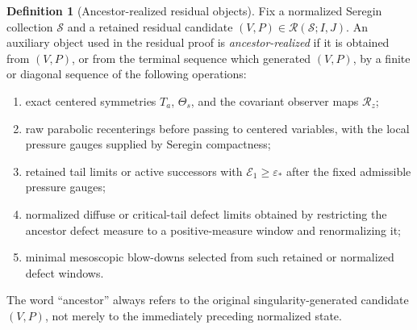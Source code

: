\documentclass[11pt]{amsart}
\numberwithin{equation}{section}
\theoremstyle{plain}
\theoremstyle{definition}
\newtheorem{definition}[theorem]{Definition}
\theoremstyle{remark}
\newcommand{\eps}{\varepsilon}
\newcommand{\calS}{\mathcal S}
\newcommand{\calR}{\mathcal R}
\newcommand{\calE}{\mathcal E}
\begin{document}
\begin{definition}[Ancestor-realized residual objects]
\label{def:ancestor-realized-residual-object}
Fix a normalized Seregin collection \(\calS\) and a retained residual candidate
\((V,P)\in\calR(\calS;I,J)\).  An auxiliary object used in the residual proof is
\emph{ancestor-realized} if it is obtained from \((V,P)\), or from the terminal
sequence which generated \((V,P)\), by a finite or diagonal sequence of the
following operations:
\begin{enumerate}[label=\textup{(\roman*)}]
   \item exact centered symmetries \(T_a\), \(\Theta_s\), and the covariant
   observer maps \(\calR_z\);
   \item raw parabolic recenterings before passing to centered variables, with
   the local pressure gauges supplied by Seregin compactness;
   \item retained tail limits or active successors with
   \(\calE_1\ge\eps_*\) after the fixed admissible pressure gauges;
   \item normalized diffuse or critical-tail defect limits obtained by
   restricting the ancestor defect measure to a positive-measure window and
   renormalizing it;
   \item minimal mesoscopic blow-downs selected from such retained or
   normalized defect windows.
\end{enumerate}
The word ``ancestor'' always refers to the original singularity-generated
candidate \((V,P)\), not merely to the immediately preceding normalized state.
\end{definition}
\end{document}
